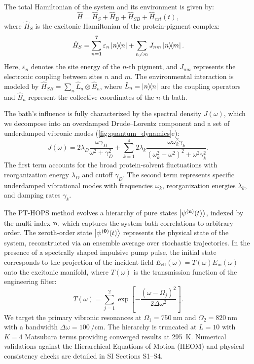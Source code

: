 \documentclass[journal=jpcl,manuscript=letter]{achemso}
\begin{document}
The total Hamiltonian of the system and its environment is given by:
\begin{equation}
\hat{H} = \hat{H}_S + \hat{H}_B + \hat{H}_{SB} + \hat{H}_{ext}(t),
\label{eq:total_hamiltonian}
\end{equation}
where $\hat{H}_S$ is the excitonic Hamiltonian of the protein-pigment complex:
\begin{equation}
\hat{H}_S = \sum_{n=1}^{7} \varepsilon_n \dyad{n} + \sum_{n \neq m} J_{nm} \dyad{n}{m}.
\label{eq:excitonic_hamiltonian}
\end{equation}
Here, $\varepsilon_n$ denotes the site energy of the $n$-th pigment, and $J_{nm}$ represents the electronic coupling between sites $n$ and $m$. The environmental interaction is modeled by $\hat{H}_{SB} = \sum_n \hat{L}_n \otimes \hat{B}_n$, where $\hat{L}_n = \dyad{n}$ are the coupling operators and $\hat{B}_n$ represent the collective coordinates of the $n$-th bath.

The bath's influence is fully characterized by the spectral density $J(\omega)$, which we decompose into an overdamped Drude--Lorentz component and a set of underdamped vibronic modes (\cref{fig:quantum_dynamics}e):
\begin{equation}
J(\omega) = 2\lambda_D \frac{\omega \gamma_D}{\omega^2 + \gamma_D^2} + \sum_{k=1}^4 2\lambda_k \frac{\omega \omega_k^2 \gamma_k}{(\omega_k^2 - \omega^2)^2 + \omega^2 \gamma_k^2}.
\label{eq:spectral_density}
\end{equation}
The first term accounts for the broad protein-solvent fluctuations with reorganization energy $\lambda_D$ and cutoff $\gamma_D$. The second term represents specific underdamped vibrational modes with frequencies $\omega_k$, reorganization energies $\lambda_k$, and damping rates $\gamma_k$.

The PT-HOPS method evolves a hierarchy of pure states $\ket{\psi^{(\vb{n})}(t)}$, indexed by the multi-index $\vb{n}$, which captures the system-bath correlations to arbitrary order. The zeroth-order state $\ket{\psi^{(\vb{0})}(t)}$ represents the physical state of the system, reconstructed via an ensemble average over stochastic trajectories. In the presence of a spectrally shaped impulsive pump pulse, the initial state corresponds to the projection of the incident field $E_{\mathrm{eff}}(\omega) = T(\omega) E_{\mathrm{in}}(\omega)$ onto the excitonic manifold, where $T(\omega)$ is the transmission function of the engineering filter:
\begin{equation}
T(\omega) = \sum_{j=1}^2 \exp\left[ -\frac{(\omega - \Omega_{j})^2}{2\Delta\omega^2} \right].
\label{eq:transmission_function}
\end{equation}
We target the primary vibronic resonances at $\Omega_1 = \SI{750}{\nano\meter}$ and $\Omega_2 = \SI{820}{\nano\meter}$ with a bandwidth $\Delta\omega = \SI{100}{\per\centi\meter}$. The hierarchy is truncated at $L=10$ with $K=4$ Matsubara terms providing converged results at \SI{295}{\kelvin}. Numerical validations against the Hierarchical Equations of Motion (HEOM) and physical consistency checks are detailed in SI Sections S1--S4.
\end{document}
